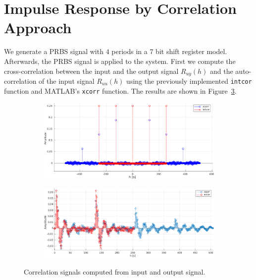 \documentclass{scrartcl}
\begin{document}
\section{Impulse Response by Correlation Approach}
We generate a PRBS signal with $4$ periods in a $7$ bit shift register model.
Afterwards, the PRBS signal is applied to the system.
First we compute the cross-correlation between the input and the output signal $R_{uy}(h)$ and the auto-correlation of the input signal $R_{uu}(h)$ using the previously implemented \texttt{intcor} function and MATLAB's \texttt{xcorr} function. The results are shown in Figure~\ref{fig:cross_correlations}.
\begin{figure}[h]
	\centering
	\begin{subfigure}{0.6\textwidth}
		\includegraphics[width=\textwidth]{figures/ac.pdf}
		\label{fig:cc_ac}
	\end{subfigure}
	\begin{subfigure}{0.6\textwidth}
		\includegraphics[width=\textwidth]{figures/cc.pdf}
		\label{fig:cc_cc}
	\end{subfigure}
	\caption{Correlation signals computed from input and output signal.}\label{fig:cross_correlations}
\end{figure}
\end{document}
